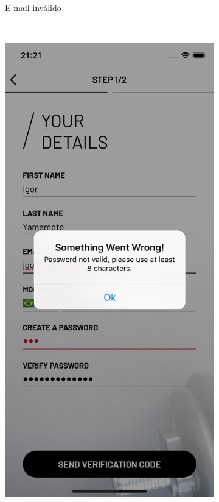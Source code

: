 \begin{figure}[H]
\begin{subfigure}[b]{0.3\textwidth}
        \caption{E-mail inválido}
        \label{fig:email-not-valid}
    \end{subfigure}
    ~
	\begin{subfigure}[b]{0.3\textwidth}
        \includegraphics[width=\textwidth]{pfc/figuras/password-not-valid.png}

\end{subfigure}
\end{figure}
